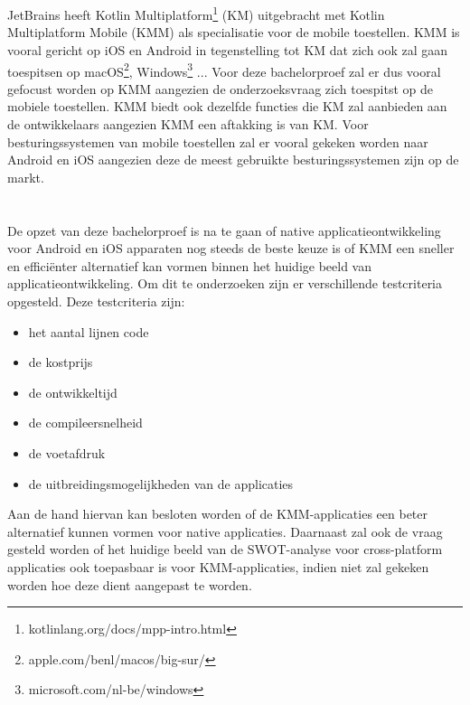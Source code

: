 \section{}
\label{sec:afbakening}

JetBrains heeft Kotlin Multiplatform\footnote{kotlinlang.org/docs/mpp-intro.html} (KM) uitgebracht met Kotlin Multiplatform Mobile (KMM) als specialisatie voor de mobile toestellen. KMM is vooral gericht op iOS en Android in tegenstelling tot KM dat zich ook zal gaan toespitsen op macOS\footnote{apple.com/benl/macos/big-sur/}, Windows\footnote{microsoft.com/nl-be/windows} ... Voor deze bachelorproef zal er dus vooral gefocust worden op KMM aangezien de onderzoeksvraag zich toespitst op de mobiele toestellen. KMM biedt ook dezelfde functies die KM zal aanbieden aan de ontwikkelaars aangezien KMM een aftakking is van KM. Voor besturingssystemen van mobile toestellen zal er vooral gekeken worden naar Android en iOS aangezien deze de meest gebruikte besturingssystemen zijn op de markt.


\section{}
\label{sec:onderzoeksvraag}

De opzet van deze bachelorproef is na te gaan of native applicatieontwikkeling voor Android en iOS apparaten nog steeds de beste keuze is of KMM een sneller en efficiënter alternatief kan vormen binnen het huidige beeld van applicatieontwikkeling. Om dit te onderzoeken zijn er verschillende testcriteria opgesteld. Deze testcriteria zijn: 
\begin{itemize}
    \item het aantal lijnen code
    \item de kostprijs
    \item de ontwikkeltijd
    \item de compileersnelheid
    \item de voetafdruk
    \item de uitbreidingsmogelijkheden van de applicaties
\end{itemize}
Aan de hand hiervan kan besloten worden of de KMM-applicaties een beter alternatief kunnen vormen voor native applicaties. Daarnaast zal ook de vraag gesteld worden of het huidige beeld van de SWOT-analyse voor cross-platform applicaties ook toepasbaar is voor KMM-applicaties, indien niet zal gekeken worden hoe deze dient aangepast te worden. 


